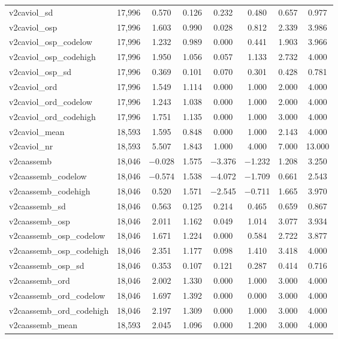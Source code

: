 \begin{table}[!htbp]
\begin{tabular}{@{\extracolsep{5pt}}lccccccc}
v2caviol\_sd & 17,996 & 0.570 & 0.126 & 0.232 & 0.480 & 0.657 & 0.977 \\ 
v2caviol\_osp & 17,996 & 1.603 & 0.990 & 0.028 & 0.812 & 2.339 & 3.986 \\ 
v2caviol\_osp\_codelow & 17,996 & 1.232 & 0.989 & 0.000 & 0.441 & 1.903 & 3.966 \\ 
v2caviol\_osp\_codehigh & 17,996 & 1.950 & 1.056 & 0.057 & 1.133 & 2.732 & 4.000 \\ 
v2caviol\_osp\_sd & 17,996 & 0.369 & 0.101 & 0.070 & 0.301 & 0.428 & 0.781 \\ 
v2caviol\_ord & 17,996 & 1.549 & 1.114 & 0.000 & 1.000 & 2.000 & 4.000 \\ 
v2caviol\_ord\_codelow & 17,996 & 1.243 & 1.038 & 0.000 & 1.000 & 2.000 & 4.000 \\ 
v2caviol\_ord\_codehigh & 17,996 & 1.751 & 1.135 & 0.000 & 1.000 & 3.000 & 4.000 \\ 
v2caviol\_mean & 18,593 & 1.595 & 0.848 & 0.000 & 1.000 & 2.143 & 4.000 \\ 
v2caviol\_nr & 18,593 & 5.507 & 1.843 & 1.000 & 4.000 & 7.000 & 13.000 \\ 
v2caassemb & 18,046 & $-$0.028 & 1.575 & $-$3.376 & $-$1.232 & 1.208 & 3.250 \\ 
v2caassemb\_codelow & 18,046 & $-$0.574 & 1.538 & $-$4.072 & $-$1.709 & 0.661 & 2.543 \\ 
v2caassemb\_codehigh & 18,046 & 0.520 & 1.571 & $-$2.545 & $-$0.711 & 1.665 & 3.970 \\ 
v2caassemb\_sd & 18,046 & 0.563 & 0.125 & 0.214 & 0.465 & 0.659 & 0.867 \\ 
v2caassemb\_osp & 18,046 & 2.011 & 1.162 & 0.049 & 1.014 & 3.077 & 3.934 \\ 
v2caassemb\_osp\_codelow & 18,046 & 1.671 & 1.224 & 0.000 & 0.584 & 2.722 & 3.877 \\ 
v2caassemb\_osp\_codehigh & 18,046 & 2.351 & 1.177 & 0.098 & 1.410 & 3.418 & 4.000 \\ 
v2caassemb\_osp\_sd & 18,046 & 0.353 & 0.107 & 0.121 & 0.287 & 0.414 & 0.716 \\ 
v2caassemb\_ord & 18,046 & 2.002 & 1.330 & 0.000 & 1.000 & 3.000 & 4.000 \\ 
v2caassemb\_ord\_codelow & 18,046 & 1.697 & 1.392 & 0.000 & 0.000 & 3.000 & 4.000 \\ 
v2caassemb\_ord\_codehigh & 18,046 & 2.197 & 1.309 & 0.000 & 1.000 & 3.000 & 4.000 \\ 
v2caassemb\_mean & 18,593 & 2.045 & 1.096 & 0.000 & 1.200 & 3.000 & 4.000 \\ 

\end{tabular}
\end{table}
